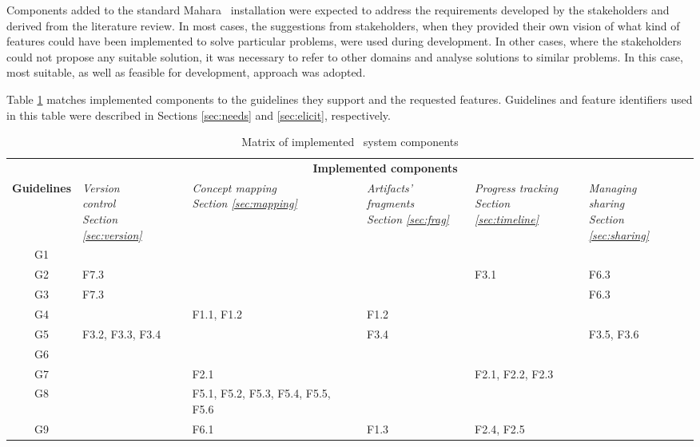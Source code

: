 Components added to the standard Mahara \ep~installation were expected to
address the requirements developed by the stakeholders and derived from the
literature review. In most cases, the suggestions from stakeholders, when they
provided their own vision of what kind of features could have been implemented
to solve particular problems, were used during development. In other cases,
where the stakeholders could not propose any suitable solution, it was necessary
to refer to other domains and analyse solutions to similar problems. In this
case, most suitable, as well as feasible for development, approach was adopted.

Table \ref{tab:implement} matches implemented components to the guidelines they
support and the requested features. Guidelines and feature identifiers used in
this table were described in Sections \ref{sec:needs} and \ref{sec:elicit},
respectively.

\begin{table}[htb]
  \setlength{\abovecaptionskip}{0pt}
  \caption{Matrix of implemented \ep~system components}
  \begin{center} \small
    \begin{tabular}{| c || p{2cm} | p{2cm} | p{2cm} | p{2cm} | p{2cm} |}
    \hline
     \multicolumn{1}{|c||}{} &
     \multicolumn{5}{c|}{\textbf{Implemented components}} \\ \cline{2-6}
     \textbf{Guidelines} & 
     \textit{Version \newline control \newline Section \ref{sec:version}} & 
     \textit{Concept mapping \newline Section \ref{sec:mapping}} & 
     \textit{Artifacts' fragments \newline Section \ref{sec:frag}} & 
     \textit{Progress tracking \newline Section \ref{sec:timeline}} & 
     \textit{Managing \newline sharing \newline Section \ref{sec:sharing}} \\
     \hline \hline
     \rowcolor[gray]{.8} G1 & & & & & \\ \hline
     G2 & F7.3 & & & F3.1 & F6.3\\ \hline
     G3 & F7.3 & & & & F6.3 \\ \hline
     G4 & & F1.1, F1.2 & F1.2 & & \\ \hline
     G5 & F3.2, F3.3, \newline F3.4 & & F3.4 & & F3.5, F3.6 \\ \hline
     \rowcolor[gray]{.8} G6 & & & & & \\ \hline
     G7 & & F2.1 & & F2.1, F2.2, \newline F2.3 & \\ \hline
     G8 & & F5.1, F5.2, \newline F5.3, F5.4, \newline F5.5, F5.6 & & & \\ \hline
     G9 & & F6.1 & F1.3 & F2.4, F2.5 & \\ \hline
    \end{tabular}
  \end{center}
  \label{tab:implement}
\end{table}

